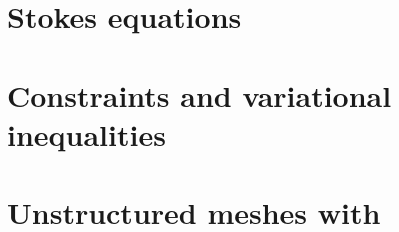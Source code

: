\documentclass{tufte-book}
\newcommand{\CODELOC}{}  %
\newcommand{\stubinput}[2]{}
\newcommand{\stubinput}[2]{\vspace{5cm} \centerline{\LARGE Percent completed:  \Huge #2\%.} \vfill}
\theoremstyle{definition}
\begin{document}
\chapter{Stokes equations}
\label{chap:ok}
\renewcommand{\CODELOC}{ch11/}
\stubinput{chaps/stokes.tex}{5}
%

\chapter{Constraints and variational inequalities}
\label{chap:co}
\renewcommand{\CODELOC}{ch12/}
\stubinput{chaps/constrained.tex}{20}
%

\chapter{Unstructured meshes with \pDMPlex}
\label{chap:dp}
\renewcommand{\CODELOC}{ch13/}
\stubinput{chaps/dmplex.tex}{0}






\backmatter




\clearpage

\newcommand{\tblockeqncode}[3]{
\begin{tabular}[t]{l} #1 \\ \quad {\normalsize \texttt{#3}} \\ \qquad \fbox{\small #2} \end{tabular}
}
\newcommand{\tblockcode}[2]{
\begin{tabular}[t]{l} #1 \\ \quad {\normalsize \texttt{#2}} \end{tabular}
}
\newcommand{\tblock}[1]{
\begin{tabular}[t]{l} #1 \end{tabular}
}
\end{document}
